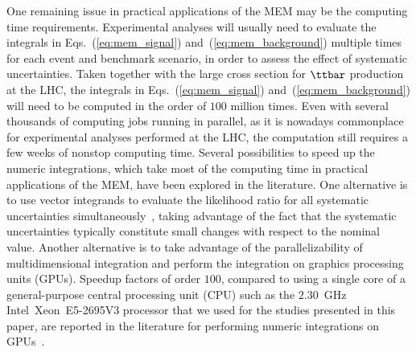 One remaining issue in practical applications of the MEM may be the computing time requirements.
Experimental analyses will usually need to evaluate the integrals in Eqs.~(\ref{eq:mem_signal}) and~(\ref{eq:mem_background})
multiple times for each event and benchmark scenario,
in order to assess the effect of systematic uncertainties.
Taken together with the large cross section for $\ttbar$ production at the LHC,
the integrals in Eqs.~(\ref{eq:mem_signal}) and~(\ref{eq:mem_background}) will need to be computed in the order of $100$ million times.
Even with several thousands of computing jobs running in parallel,
as it is nowadays commonplace for experimental analyses performed at the LHC,
the computation still requires a few weeks of nonstop computing time.
Several possibilities to speed up the numeric integrations, which take most of the computing time in practical applications of the MEM,
have been explored in the literature.
One alternative is to use vector integrands to evaluate the likelihood ratio for all systematic uncertainties simultaneously~\cite{CUBA},
taking advantage of the fact that the systematic uncertainties typically constitute small changes with respect to the nominal value.
Another alternative is to take advantage of the parallelizability of multidimensional integration and perform the integration on graphics processing units (GPUs).
Speedup factors of order $100$, compared to using a single core of a general-purpose central processing unit (CPU) 
such as the $2.30$~GHz Intel\TReg~Xeon\TReg~E5-2695V3 processor that we used for the studies presented in this paper,
are reported in the literature for performing numeric integrations on GPUs~\cite{Hagiwara:2009aq,Hagiwara:2009cy,Kanzaki:2010ym,Hagiwara:2013oka,Schouten:2014yza,Grasseau:2015vfa}.
